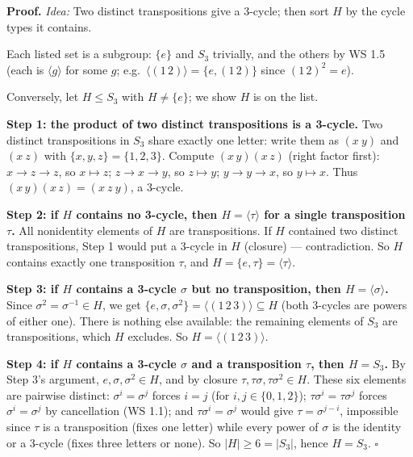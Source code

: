 \documentclass[11pt]{report}
\renewenvironment{proof}[1][Proof]{\noindent\textbf{#1.} }{\hfill$\square$\par\vspace{5pt}}
\begin{document}
\begin{proof}
\textit{Idea:} Two distinct transpositions give a $3$-cycle; then sort $H$ by the cycle types it contains.\par
Each listed set is a subgroup: $\{e\}$ and $S_3$ trivially, and the others by WS 1.5 (each is $\langle g \rangle$ for some $g$; e.g.\ $\langle (1\,2) \rangle = \{e, (1\,2)\}$ since $(1\,2)^2 = e$).

Conversely, let $H \leq S_3$ with $H \neq \{e\}$; we show $H$ is on the list.

\textbf{Step 1: the product of two distinct transpositions is a 3-cycle.} Two distinct transpositions in $S_3$ share exactly one letter: write them as $(x\ y)$ and $(x\ z)$ with $\{x, y, z\} = \{1, 2, 3\}$. Compute $(x\,y)(x\,z)$ (right factor first): $x \to z \to z$, so $x \mapsto z$; $z \to x \to y$, so $z \mapsto y$; $y \to y \to x$, so $y \mapsto x$. Thus $(x\,y)(x\,z) = (x\ z\ y)$, a 3-cycle.

\textbf{Step 2: if $H$ contains no 3-cycle, then $H = \langle \tau \rangle$ for a single transposition $\tau$.} All nonidentity elements of $H$ are transpositions. If $H$ contained two distinct transpositions, Step 1 would put a 3-cycle in $H$ (closure) --- contradiction. So $H$ contains exactly one transposition $\tau$, and $H = \{e, \tau\} = \langle \tau \rangle$.

\textbf{Step 3: if $H$ contains a 3-cycle $\sigma$ but no transposition, then $H = \langle \sigma \rangle$.} Since $\sigma^2 = \sigma^{-1} \in H$, we get $\{e, \sigma, \sigma^2\} = \langle (1\,2\,3) \rangle \subseteq H$ (both 3-cycles are powers of either one). There is nothing else available: the remaining elements of $S_3$ are transpositions, which $H$ excludes. So $H = \langle (1\,2\,3) \rangle$.

\textbf{Step 4: if $H$ contains a 3-cycle $\sigma$ and a transposition $\tau$, then $H = S_3$.} By Step 3's argument, $e, \sigma, \sigma^2 \in H$, and by closure $\tau, \tau\sigma, \tau\sigma^2 \in H$. These six elements are pairwise distinct: $\sigma^i = \sigma^j$ forces $i = j$ (for $i, j \in \{0,1,2\}$); $\tau\sigma^i = \tau\sigma^j$ forces $\sigma^i = \sigma^j$ by cancellation (WS 1.1); and $\tau\sigma^i = \sigma^j$ would give $\tau = \sigma^{j-i}$, impossible since $\tau$ is a transposition (fixes one letter) while every power of $\sigma$ is the identity or a 3-cycle (fixes three letters or none). So $|H| \geq 6 = |S_3|$, hence $H = S_3$.
\end{proof}
\end{document}
